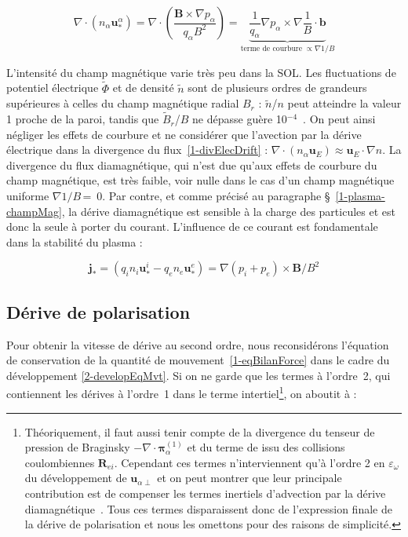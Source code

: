 \begin{refsection}
\begin{equation}
\nabla\cdot\left(n_\alpha\mathbf
u^\alpha_*\right)=\nabla\cdot\left(\frac{\mathbf B\times\nabla
p_\alpha}{q_\alpha B^2}\right)
=\underbrace{\frac{1}{q_\alpha}\nabla
p_\alpha\times\nabla\frac{1}{B}\cdot \mathbf b}_{\text{terme de
courbure}\;\propto\nabla 1/B}
\end{equation}

L'intensité du champ magnétique varie très peu dans la SOL. Les fluctuations de
potentiel électrique $\widetilde{\Phi}$ et de densité $\widetilde{n}$
sont de plusieurs ordres de grandeurs supérieures à celles du champ magnétique
radial $B_r$ : $\widetilde{n}$/$n$ peut atteindre la valeur 1 proche de la
paroi, tandis que $\widetilde{B}_r$/$B$ ne dépasse guère
10$^{-4}$~\parencite{SarazinPhD}.
On peut ainsi négliger les effets de courbure et ne considérer que l'avection par
la dérive électrique dans la divergence du flux~\eqref{1-divElecDrift} :
$\nabla\cdot(n_\alpha\mathbf u_E)\approx \mathbf u_E\cdot\nabla n$. La divergence du flux diamagnétique, qui
n'est due qu'aux effets de courbure du champ magnétique, est très faible, voir
nulle dans le cas d'un champ magnétique uniforme $\nabla1/B\,$=~0.
Par contre, et comme précisé au paragraphe \S~\ref{1-plasma-champMag}, la dérive
diamagnétique est sensible à la charge des particules et est donc la seule à porter du courant.
L'influence de ce courant est fondamentale dans la stabilité du plasma :

\begin{equation}
\mathbf j_*=(q_in_i\mathbf u^i_*-q_en_e\mathbf
u^e_*)=\nabla(p_i+p_e)\times\mathbf B/B^2
\end{equation}



\subsection{Dérive de polarisation}

Pour obtenir la vitesse de dérive au second ordre, nous reconsidérons
l'équation de conservation de la quantité de mouvement~\eqref{1-eqBilanForce}
dans le cadre du développement \eqref{2-developEqMvt}. Si on
ne garde que les termes à l'ordre~2, qui contiennent les dérives à l'ordre~1
dans le terme intertiel\footnote{\label{2-footnoteBraginsky}Théoriquement, il faut aussi
tenir compte de la divergence du tenseur de pression de Braginsky
$-\nabla\cdot\boldsymbol{\pi}^{(1)}_\alpha$ et du terme de issu des collisions
coulombiennes $\mathbf R_{ei}$. Cependant ces termes
n'interviennent qu'à l'ordre 2 en
$\varepsilon_\omega$ du développement de $\mathbf u_{\alpha\perp}$ et on peut
montrer que leur principale contribution est de compenser les termes inertiels
d'advection par la dérive diamagnétique~\parencite{Tamain2}. Tous ces termes
disparaissent donc de l'expression finale de la dérive de polarisation et
nous les omettons pour des raisons de simplicité.}, on aboutit à :


\end{refsection}
